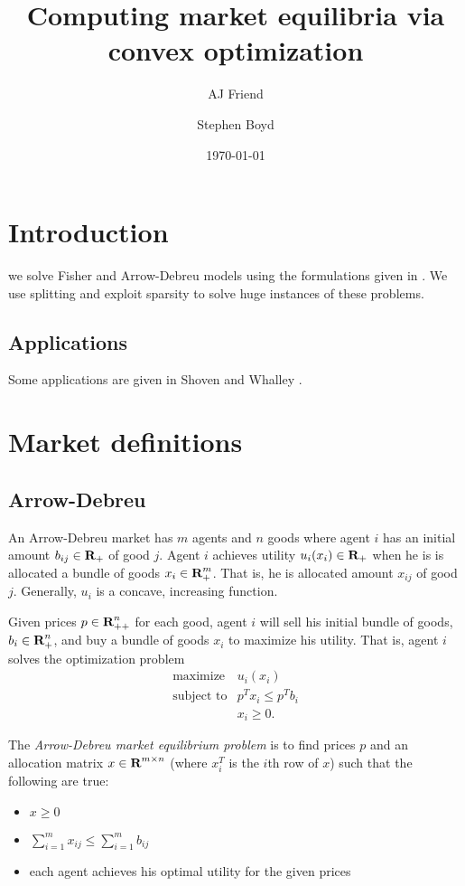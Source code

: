 \documentclass{article}
\title{Computing market equilibria via convex optimization}
\author{AJ Friend \and Stephen Boyd}
\date{\today}
\begin{document}
\maketitle

\listoftodos

\section{Introduction}
we solve Fisher and Arrow-Debreu models using the formulations given in . We use splitting and exploit sparsity to solve huge instances of these problems.

\subsection{Applications}
Some applications are given in Shoven and Whalley \cite{shoven1992applying}.

\section{Market definitions}
\subsection{Arrow-Debreu}

An Arrow-Debreu market has $m$ agents and $n$ goods where
agent $i$ has an initial amount $b_{ij} \in {\mbox{\bf R}}_+$ of good $j$.
Agent $i$ achieves utility $u_i(x_i) \in {\mbox{\bf R}}_+$ when he is is allocated a bundle of goods $x_i \in {\mbox{\bf R}}^m_{+}$.
That is, he is allocated amount $x_{ij}$ of good $j$.
Generally, $u_i$ is a concave, increasing function.

Given prices $p \in {\mbox{\bf R}}^n_{++}$ for each good, agent $i$ will sell his initial bundle of goods, $b_i \in {\mbox{\bf R}}^n_+ $, and buy a bundle of goods $x_i$ to maximize his utility.
That is, agent $i$ solves the optimization problem
\[
\begin{array}{ll}
\mbox{maximize} & u_i(x_i) \\
\mbox{subject to} & p^T x_i \leq p^T b_i \\
& x_i \geq 0.
\end{array}
\]

The \emph{Arrow-Debreu market equilibrium problem} is to find prices $p$ and an allocation matrix $x \in {\mbox{\bf R}}^{m \times n}$ (where $x_i^T$ is the $i$th row of $x$) such that the following are true:
\begin{itemize}
\item $x \geq 0$
\item $\sum_{i=1}^m x_{ij} \leq \sum_{i=1}^m b_{ij}$
\item each agent achieves his optimal utility for the given prices
\end{itemize}
\end{document}
